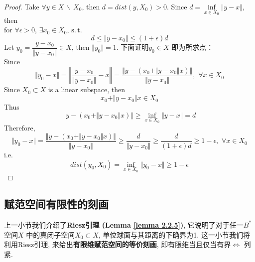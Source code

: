 \begin{lemma}
		\newpage
		
		\begin{proof}
			Take $\forall y \in X \, \backslash \, X_0$, then $d = dist(y , X_0) > 0$. Since $d = \underset{x \in X_0}{\inf} \Vert y - x \Vert$, then \\
			for $\forall \epsilon > 0$, $\exists x_0 \in X_0$, $\operatorname{s.t.}$
			\[ d \leq \Vert y - x_0 \Vert \leq (1 + \epsilon) d \]
			Let $y_0 = \dfrac{y - x_0}{\Vert y - x_0 \Vert} \in X$, then $\Vert y_0 \Vert = 1$. 下面证明$y_0 \in X$ 即为所求点：\\
			Since
			\[ \Vert y_0 - x \Vert 
			= \left\Vert \frac{y - x_0}{\Vert y - x_0 \Vert} - x \right\Vert 
			= \frac{\Big\Vert y - \left( x_0 + \Vert y - x_0 \Vert x \right) \Big\Vert}{\Vert y - x_0 \Vert} 
			, \,\, \forall x \in X_0 \]
			Since $X_0 \subset X$ is a linear subspace, then 
			\[ x_0 + \Vert y - x_0 \Vert x \in X_0 \]
			Thus
			\[ \Big\Vert y - \left( x_0 + \Vert y - x_0 \Vert x \right) \Big\Vert \geq \inf_{x \in X_0} \Vert y - x \Vert = d \]
			Therefore, 
			\[ \Vert y_0 - x \Vert 
			= \frac{\Big\Vert y - \left( x_0 + \Vert y - x_0 \Vert x \right) \Big\Vert}{\Vert y - x_0 \Vert} 
			\geq \frac{d}{\Vert y - x_0 \Vert} 
			\geq \frac{d}{(1 + \epsilon) d} 
			\geq 1 - \epsilon , \,\, \forall x \in X_0 \]
			i.e.
			\[ dist(y_0 ,X_0) = \inf_{x \in X_0} \Vert y_0 - x \Vert \geq 1 - \epsilon \]
		\end{proof}
	\end{lemma}

\newpage

\subsection{赋范空间有限性的刻画}
	上一小节我们介绍了\textbf{Riesz引理 (Lemma \ref{lemma 2.2.5})}, 它说明了对于任一$B^*$ 空间$X$ 中的真闭子空间$X_0 \subset X$, 单位球面与其距离的下确界为1. 这一小节我们将利用Riesz引理, 来给出\textbf{有限维赋范空间的等价刻画}, 即有限维当且仅当有界$\Leftrightarrow$ 列紧.
	
	\vspace{2em}
	
